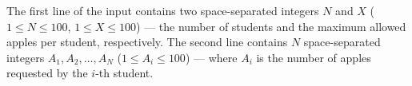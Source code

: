 
The first line of the input contains two space-separated integers $N$ and $X$ ($1 \le N \le 100$, $1 \le X \le 100$) --- the number of students and the maximum allowed apples per student, respectively.
The second line contains $N$ space-separated integers $A_1, A_2, \dots, A_N$ ($1 \le A_i \le 100$) --- where $A_i$ is the number of apples requested by the $i$-th student.